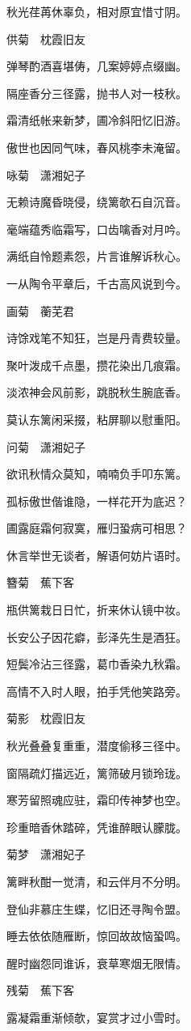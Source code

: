 秋光荏苒休辜负，相对原宜惜寸阴。

供菊　枕霞旧友

弹琴酌酒喜堪俦，几案婷婷点缀幽。

隔座香分三径露，抛书人对一枝秋。

霜清纸帐来新梦，圃冷斜阳忆旧游。

傲世也因同气味，春风桃李未淹留。

咏菊　潇湘妃子

无赖诗魔昏晓侵，绕篱欹石自沉音。

毫端蕴秀临霜写，口齿噙香对月吟。

满纸自怜题素怨，片言谁解诉秋心。

一从陶令平章后，千古高风说到今。

画菊　蘅芜君

诗馀戏笔不知狂，岂是丹青费较量。

聚叶泼成千点墨，攒花染出几痕霜。

淡浓神会风前影，跳脱秋生腕底香。

莫认东篱闲采掇，粘屏聊以慰重阳。

问菊　潇湘妃子

欲讯秋情众莫知，喃喃负手叩东篱。

孤标傲世偕谁隐，一样花开为底迟？

圃露庭霜何寂寞，雁归蛩病可相思？

休言举世无谈者，解语何妨片语时。

簪菊　蕉下客

瓶供篱栽日日忙，折来休认镜中妆。

长安公子因花癖，彭泽先生是酒狂。

短鬓冷沾三径露，葛巾香染九秋霜。

高情不入时人眼，拍手凭他笑路旁。

菊影　枕霞旧友

秋光叠叠复重重，潜度偷移三径中。

窗隔疏灯描远近，篱筛破月锁玲珑。

寒芳留照魂应驻，霜印传神梦也空。

珍重暗香休踏碎，凭谁醉眼认朦胧。

菊梦　潇湘妃子

篱畔秋酣一觉清，和云伴月不分明。

登仙非慕庄生蝶，忆旧还寻陶令盟。

睡去依依随雁断，惊回故故恼蛩鸣。

醒时幽怨同谁诉，衰草寒烟无限情。

残菊　蕉下客

露凝霜重渐倾欹，宴赏才过小雪时。

